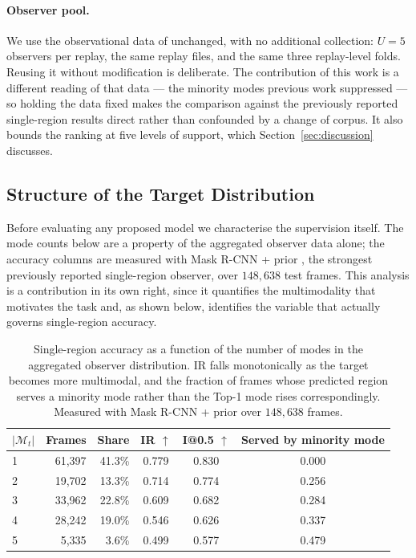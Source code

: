 \documentclass[preprint,12pt]{elsarticle}
\begin{document}
\paragraph{Observer pool.} We use the observational data of
\cite{joo2023learning} unchanged, with no additional collection: $U=5$
observers per replay, the same replay files, and the same three replay-level
folds. Reusing it without modification is deliberate. The contribution of this
work is a different reading of that data — the minority modes previous work
suppressed — so holding the data fixed makes the comparison against the
previously reported single-region results direct rather than confounded by a
change of corpus. It also bounds the ranking at five levels of support, which
Section~\ref{sec:discussion} discusses.

\subsection{Structure of the Target Distribution}
\label{subsec:target_structure}

Before evaluating any proposed model we characterise the supervision itself.
The mode counts below are a property of the aggregated observer data alone; the
accuracy columns are measured with Mask R-CNN + prior \cite{anonymous2025kbrs},
the strongest previously reported single-region observer, over $148{,}638$ test
frames. This analysis is a contribution in its own right, since it quantifies
the multimodality that motivates the task and, as shown below, identifies the
variable that actually governs single-region accuracy.

\begin{table}[t]
  \centering
  \caption{Single-region accuracy as a function of the number of modes in the
  aggregated observer distribution. IR falls monotonically as the target
  becomes more multimodal, and the fraction of frames whose predicted region
  serves a minority mode rather than the Top-1 mode rises correspondingly.
  Measured with Mask R-CNN + prior over $148{,}638$ frames.}
  \label{tab:by_nmodes}
  \begin{tabular}{lrrccc}
    \toprule
    $|\mathcal{M}_t|$ & Frames & Share & IR $\uparrow$ & I@0.5 $\uparrow$
      & Served by minority mode \\
    \midrule
    1 & 61{,}397 & 41.3\% & 0.779 & 0.830 & 0.000 \\
    2 & 19{,}702 & 13.3\% & 0.714 & 0.774 & 0.256 \\
    3 & 33{,}962 & 22.8\% & 0.609 & 0.682 & 0.284 \\
    4 & 28{,}242 & 19.0\% & 0.546 & 0.626 & 0.337 \\
    5 &  5{,}335 &  3.6\% & 0.499 & 0.577 & 0.479 \\
    \bottomrule
  \end{tabular}
\end{table}
\end{document}
